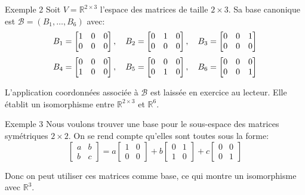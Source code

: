 \documentclass[a4paper]{article}
\begin{document}
\begin{parag}{Exemple 2}
    Soit $V = \mathbb{R}^{2\times 3}$ l'espace des matrices de taille $2 \times 3$. Sa base canonique est $\mathcal{B} = \left(B_1, \ldots, B_6\right)$ avec:
    \[B_1 = \begin{bmatrix} 1 & 0 & 0 \\ 0 & 0 & 0 \end{bmatrix}, \quad B_2 = \begin{bmatrix} 0 & 1 & 0 \\ 0 & 0 & 0 \end{bmatrix}, \quad B_3 = \begin{bmatrix} 0 & 0 & 1 \\ 0 & 0 & 0 \end{bmatrix}\]
    \[B_4 = \begin{bmatrix} 0 & 0 & 0 \\ 1 & 0 & 0 \end{bmatrix}, \quad B_5 = \begin{bmatrix} 0 & 0 & 0 \\ 0 & 1 & 0 \end{bmatrix}, \quad B_6 = \begin{bmatrix} 0 & 0 & 0 \\ 0 & 0 & 1 \end{bmatrix}\]

    L'application coordonnées associée à $\mathcal{B}$ est laissée en exercice au lecteur. Elle établit un isomorphisme entre $\mathbb{R}^{2\times3}$ et $\mathbb{R}^{6}$.
\end{parag}

\begin{parag}{Exemple 3}
    Nous voulons trouver une base pour le sous-espace des matrices symétriques $2\times 2$. On se rend compte qu'elles sont toutes sous la forme:
    \[\begin{bmatrix} a & b \\ b & c \end{bmatrix} = a\begin{bmatrix} 1 & 0 \\ 0 & 0 \end{bmatrix} + b \begin{bmatrix} 0 & 1 \\ 1 & 0 \end{bmatrix} + c\begin{bmatrix} 0 & 0 \\ 0 & 1 \end{bmatrix} \]

    Donc on peut utiliser ces matrices comme base, ce qui montre un isomorphisme avec $\mathbb{R}^{3}$.
\end{parag}
\end{document}
